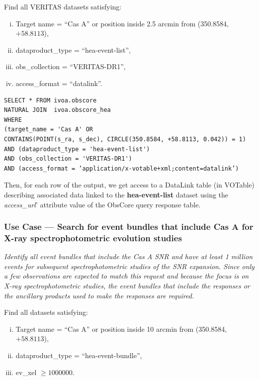 \medskip
\noindent Find all VERITAS datasets satisfying:
\begin{enumerate}[(i)]
  \item Target name = ``Cas A'' or position inside 2.5 arcmin from (350.8584, $+58.8113$),
  \item dataproduct\_type = ``hea-event-list'',
  \item obs\_collection = ``VERITAS-DR1'',
  \item access\_format = ``datalink''.
\end{enumerate}

\begin{verbatim}
SELECT * FROM ivoa.obscore
NATURAL JOIN  ivoa.obscore_hea
WHERE
(target_name = 'Cas A' OR
CONTAINS(POINT(s_ra, s_dec), CIRCLE(350.8584, +58.8113, 0.042)) = 1)
AND (dataproduct_type = 'hea-event-list')
AND (obs_collection = 'VERITAS-DR1')
AND (access_format = ’application/x-votable+xml;content=datalink’)
\end{verbatim}

Then, for each row of the output, we get access to a DataLink table (in VOTable) describing associated data linked to the {\bf hea-event-list} dataset using the {\em access\_url\/}' attribute value of the  ObsCore query response table.

\subsubsection{Use Case --- Search for event bundles that include Cas A for X-ray spectrophotometric evolution studies}

{\em Identify all event bundles that include the Cas A SNR and have at least 1 million events for subsequent spectrophotometric studies of the SNR expansion. Since only a few observations are expected to match this request and because the focus is on X-ray spectrophotometric studies, the event bundles that include the responses or the ancillary products used to make the responses are required.\/}

\medskip
\noindent Find all datasets satisfying:
\begin{enumerate}[(i)]
  \item Target name = ``Cas A'' or position inside 10 arcmin from (350.8584, $+58.8113$),
  \item dataproduct\_type = ``hea-event-bundle'',
  \item ev\_xel $\geq 1000000$.
\end{enumerate}

